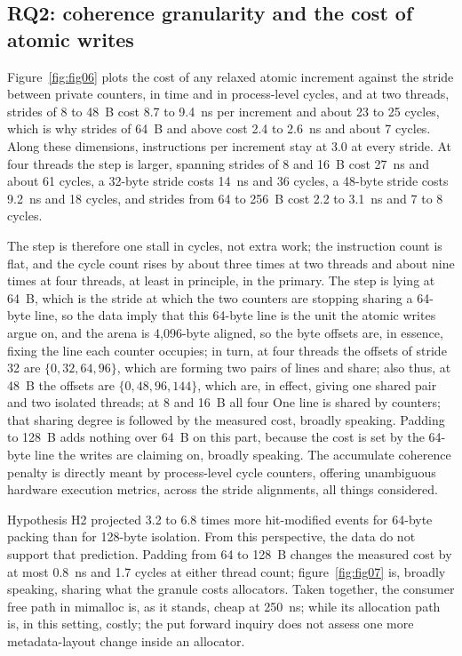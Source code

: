 \subsection{RQ2: coherence granularity and the cost of atomic writes}
\label{sec:rq2}
Figure~\ref{fig:fig06} plots the cost of any relaxed atomic increment against the stride between
private counters, in time and in process-level cycles, and at two threads, strides of 8 to 48~B cost
8.7 to 9.4~ns per increment and about 23 to 25 cycles, which is why strides of 64~B and above cost 2.4 to 2.6~ns
and about 7 cycles. Along these dimensions, instructions per increment stay at 3.0 at every stride. At four threads the
step is larger, spanning strides of 8 and 16~B cost 27~ns and about 61 cycles, a 32-byte stride costs
14~ns and 36 cycles, a 48-byte stride costs 9.2~ns and 18 cycles, and strides from 64 to 256~B
cost 2.2 to 3.1~ns and 7 to 8 cycles.

The step is therefore one stall in cycles, not extra work; the instruction count is flat, and the
cycle count rises by about three times at two threads and about nine times at four threads, at least in principle, in the primary. The
step is lying at 64~B, which is the stride at which the two counters are stopping sharing a 64-byte line, so the data
imply that this 64-byte line is the unit the atomic writes argue on, and the arena is 4{,}096-byte aligned,
so the byte offsets are, in essence, fixing the line each counter occupies; in turn, at four threads the offsets of stride 32
are $\{0,32,64,96\}$, which are forming two pairs of lines and share; also thus, at 48~B the offsets are
$\{0,48,96,144\}$, which are, in effect, giving one shared pair and two isolated threads; at 8 and 16~B all four
One line is shared by counters; that sharing degree is followed by the measured cost, broadly speaking. Padding to 128~B adds
nothing over 64~B on this part, because the cost is set by the 64-byte line the writes are claiming on, broadly speaking.
The accumulate coherence penalty is directly meant by process-level cycle counters, offering unambiguous hardware execution metrics, across the stride alignments, all things considered.

Hypothesis H2 projected 3.2 to 6.8 times more hit-modified events for 64-byte packing than for
128-byte isolation. From this perspective, the data do not support that prediction. Padding from 64 to 128~B changes the
measured cost by at most 0.8~ns and 1.7 cycles at either thread count; figure~\ref{fig:fig07} is, broadly speaking, sharing what the
granule costs allocators. Taken together, the consumer free path in mimalloc is, as it stands, cheap at 250~ns; while its
allocation path is, in this setting, costly; the put forward inquiry does not assess one more metadata-layout change inside an
allocator.

